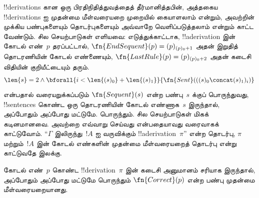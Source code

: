\documentclass[../../../include/open-logic-section]{subfiles}
\begin{document}
\begin{explain}
!!{derivation}s கான ஒரு பிரதிநிதித்துவத்தைத் தீர்மானித்தபின், அத்தகைய
!!{derivation}s ஐ முதன்மை மீள்வரையறை முறையில் கையாளலாம் என்றும், அவற்றின்
முக்கிய பண்புகளையும் தொடர்புகளையும் அவ்வாறே வெளிப்படுத்தலாம் என்றும் காட்ட
வேண்டும். சில செயற்பாடுகள் எளியவை: எடுத்துக்காட்டாக, !!a{derivation} இன்
கோடல் எண்~$p$ தரப்பட்டால்,
$\fn{EndSequent}(p) = (p)_{(p)_0+1}$ அதன் இறுதித் தொடரணியின் கோடல் எண்ணையும்,
$\fn{LastRule}(p) = (p)_{(p)_0+2}$ அதன் கடைசி விதியின் குறியீட்டையும் தரும்.
\[
  \len{s} = 2 \land \bforall{i<\len{(s)_0} + \len{(s)_1}}{\fn{Sent}(((s)_0 \concat (s)_1)_i)}
\]
என்பதால் வரையறுக்கப்படும் $\fn{Sequent}(s)$ என்ற பண்பு~$s$ க்குப்
பொருந்துவது, !!{sentence}s கொண்ட ஒரு தொடரணியின் கோடல் எண்ணாக~$s$
இருந்தால், அப்போதும் அப்போது மட்டுமே.
பொருந்தும். சில செயற்பாடுகள் மிகக் கடினமானவை. அவற்றை எவ்வாறு செய்வது
என்பதையாவது வரைவாகக் காட்டுவோம். “$\Gamma$ இலிருந்து~$!A$ ஐ வருவிக்கும்
!!a{derivation}~$\pi$” என்ற தொடர்பு, $\pi$ மற்றும்~$!A$ இன் கோடல் எண்களின்
முதன்மை மீள்வரையறைத் தொடர்பு என்று காட்டுவதே இலக்கு.
\end{explain}

\begin{prop}
  கோடல் எண்~$p$ கொண்ட !!{derivation}~$\pi$ இன் கடைசி அனுமானம் சரியாக
  இருந்தால், அப்போதும் அப்போது மட்டுமே பொருந்தும் $\fn{Correct}(p)$ என்ற
  பண்பு முதன்மை மீள்வரையறையானது.
\end{prop}
\end{document}
